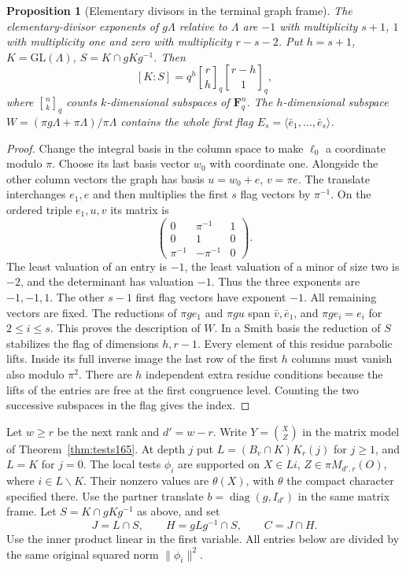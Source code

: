 \documentclass[a4paper,11pt]{article}
\newtheorem{proposition}{Proposition}[section]
\theoremstyle{definition}
\theoremstyle{remark}
\numberwithin{equation}{section}
\begin{document}
\begin{proposition}[Elementary divisors in the terminal graph frame]\leavevmode\label{prop:graphframe340}
The elementary-divisor exponents of $g\Lambda$ relative to $\Lambda$
are $-1$ with multiplicity $s+1$, $1$ with multiplicity one and
zero with multiplicity $r-s-2$. Put $h=s+1$, $K=\mathrm{GL}(\Lambda)$,
$S=K\cap gKg^{-1}$. Then
\[
       [K:S]=q^h {r\brack h}_q {r-h\brack 1}_q ,
\]
where ${n\brack k}_q$ counts $k$-dimensional subspaces of
$\mathbf F_q^n$. The $h$-dimensional subspace
$W=(\pi g\Lambda+\pi\Lambda)/\pi\Lambda$ contains the whole first
flag $E_s=\langle\bar e_1,\ldots,\bar e_s\rangle$.
\end{proposition}
\begin{proof}
Change the integral basis in the column space to make $\ell_0$ a
coordinate modulo $\pi$. Choose its last basis vector $w_0$ with
coordinate one. Alongside the other column vectors the graph has
basis $u=w_0+e$, $v=\pi e$. The translate interchanges $e_1,e$ and
then multiplies the first $s$ flag vectors by $\pi^{-1}$. On the
ordered triple $e_1,u,v$ its matrix is
\[
 \begin{pmatrix}0&\pi^{-1}&1\\0&1&0\\
                 \pi^{-1}&-\pi^{-1}&0\end{pmatrix}.
\]
The least valuation of an entry is $-1$, the least valuation of a
minor of size two is $-2$, and the determinant has valuation $-1$.
Thus the three exponents are $-1,-1,1$. The other $s-1$ first flag
vectors have exponent $-1$. All remaining vectors are fixed. The
reductions of $\pi g e_1$ and $\pi g u$ span $\bar v,\bar e_1$,
and $\pi g e_i=e_i$ for $2\le i\le s$. This proves the description
of $W$. In a Smith basis the reduction of $S$ stabilizes the flag
of dimensions $h,r-1$. Every element of this residue parabolic
lifts. Inside its full inverse image the last row of the first
$h$ columns must vanish also modulo $\pi^2$. There are $h$
independent extra residue conditions because the lifts of the
entries are free at the first congruence level. Counting the two successive
subspaces in the flag gives the index.
\end{proof}

Let $w\ge r$ be the next rank and $d'=w-r$. Write $Y=\binom{X}{Z}$
in the matrix model of Theorem~\ref{thm:tests165}. At depth $j$ put
$L=(B_v\cap K)K_r(j)$ for $j\ge1$, and $L=K$ for $j=0$. The local
tests $\phi_i$ are supported on $X\in Li$, $Z\in\pi M_{d',r}(O)$,
where $i\in L\backslash K$. Their nonzero values are $\theta(X)$,
with $\theta$ the compact character specified there. Use the partner
translate $b=\operatorname{diag}(g,I_{d'})$ in the same matrix
frame. Let $S=K\cap gKg^{-1}$ as above, and set
\[
         J=L\cap S,\qquad H=gLg^{-1}\cap S,\qquad C=J\cap H.
\]
Use the inner product linear in the first variable. All entries below
are divided by the same original squared norm $\|\phi_i\|^2$.
\end{document}
